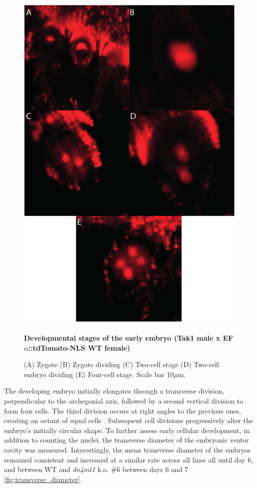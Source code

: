 \begin{figure}[htbp!] 
\centering    
    \includegraphics[width=1\textwidth]{Chapter3/Figs/Figure10_Developmental_stages.pdf}
\caption{\textbf{Developmental stages of the early embryo (Tak1 male x EF$\alpha$::tdTomato-NLS WT female)}}
\label{fig:dev_stages}
\captionsetup{font=small}
    \caption*{(A) Zygote (B) Zygote dividing (C) Two-cell stage (D) Two-cell embryo dividing (E) Four-cell stage. Scale bar 10$\mu$m.}
\end{figure}

The developing embryo initially elongates through a transverse division, perpendicular to the archegonial axis, followed by a second vertical division to form four cells. The third division occurs at right angles to the previous ones, creating an octant of equal cells \cite{RN143,RN144}. Subsequent cell divisions progressively alter the embryo's initially circular shape. To further assess early cellular development, in addition to counting the nuclei, the transverse diameter of the embryonic venter cavity was measured. Interestingly, the mean transverse diameter of the embryos remained consistent and increased at a similar rate across all lines all until day 6, and between WT and \textit{dn4mt1} k.o. \#6 between days 6 and 7 \ref{fig:transverse_diameter}.

